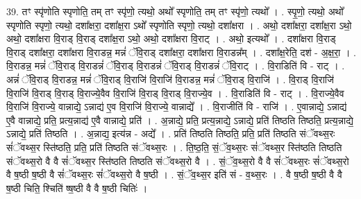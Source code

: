 \documentclass[17pt]{extarticle}
\begin{document}
39. तꣳ स्पृ॑णोति स्पृणोति॒ तम् तꣳ स्पृ॑णो॒ त्यथो॒ अथो᳚ स्पृणोति॒ तम् तꣳ स्पृ॑णो॒ त्यथो᳚ । . स्पृ॒णो॒ त्यथो॒ अथो᳚ स्पृणोति स्पृणो॒ त्यथो॒ दशा᳚क्षरा॒ दशा᳚क्ष॒रा ऽथो᳚ स्पृणोति स्पृणो॒ त्यथो॒ दशा᳚क्षरा । . अथो॒ दशा᳚क्षरा॒ दशा᳚क्ष॒रा ऽथो॒ अथो॒ दशा᳚क्षरा वि॒राड् वि॒राड् दशा᳚क्ष॒रा ऽथो॒ अथो॒ दशा᳚क्षरा वि॒राट् । . अथो॒ इत्यथो᳚ । . दशा᳚क्षरा वि॒राड् वि॒राड् दशा᳚क्षरा॒ दशा᳚क्षरा वि॒राडन्न॒ मन्नं॑ ॅवि॒राड् दशा᳚क्षरा॒ दशा᳚क्षरा वि॒राडन्न᳚म् । . दशा᳚क्ष॒रेति॒ दश॑ - अ॒क्ष॒रा॒ । . वि॒राडन्न॒ मन्नं॑ ॅवि॒राड् वि॒राडन्नं॑ ॅवि॒राड् वि॒राडन्नं॑ ॅवि॒राड् वि॒राडन्नं॑ ॅवि॒राट् । . वि॒राडिति॑ वि - राट् । . अन्नं॑ ॅवि॒राड् वि॒राडन्न॒ मन्नं॑ ॅवि॒राड् वि॒राजि॑ वि॒राजि॑ वि॒राडन्न॒ मन्नं॑ ॅवि॒राड् वि॒राजि॑ । . वि॒राड् वि॒राजि॑ वि॒राजि॑ वि॒राड् वि॒राड् वि॒राज्ये॒वैव वि॒राजि॑ वि॒राड् वि॒राड् वि॒राज्ये॒व । . वि॒राडिति॑ वि - राट् । . वि॒राज्ये॒वैव वि॒राजि॑ वि॒राज्ये॒ वान्नाद्ये॒ ऽन्नाद्य॑ ए॒व वि॒राजि॑ वि॒राज्ये॒ वान्नाद्ये᳚ । . वि॒राजीति॑ वि - राजि॑ । . ए॒वान्नाद्ये॒ ऽन्नाद्य॑ ए॒वै वान्नाद्ये॒ प्रति॒ प्रत्य॒न्नाद्य॑ ए॒वै वान्नाद्ये॒ प्रति॑ । . अ॒न्नाद्ये॒ प्रति॒ प्रत्य॒न्नाद्ये॒ ऽन्नाद्ये॒ प्रति॑ तिष्ठति तिष्ठति॒ प्रत्य॒न्नाद्ये॒ ऽन्नाद्ये॒ प्रति॑ तिष्ठति । . अ॒न्नाद्य॒ इत्य॑न्न - अद्ये᳚ । . प्रति॑ तिष्ठति तिष्ठति॒ प्रति॒ प्रति॑ तिष्ठति संॅवथ्स॒रः सं॑ॅवथ्स॒र स्ति॑ष्ठति॒ प्रति॒ प्रति॑ तिष्ठति संॅवथ्स॒रः । . ति॒ष्ठ॒ति॒ सं॒ॅव॒थ्स॒रः सं॑ॅवथ्स॒र स्ति॑ष्ठति तिष्ठति संॅवथ्स॒रो वै वै सं॑ॅवथ्स॒र स्ति॑ष्ठति तिष्ठति संॅवथ्स॒रो वै । . सं॒ॅव॒थ्स॒रो वै वै सं॑ॅवथ्स॒रः सं॑ॅवथ्स॒रो वै ष॒ष्ठी ष॒ष्ठी वै सं॑ॅवथ्स॒रः सं॑ॅवथ्स॒रो वै ष॒ष्ठी । . सं॒ॅव॒थ्स॒र इति॑ सं - व॒थ्स॒रः । . वै ष॒ष्ठी ष॒ष्ठी वै वै ष॒ष्ठी चिति॒ श्चिति॑ ष्ष॒ष्ठी वै वै ष॒ष्ठी चितिः॑ । \newline
\end{document}
